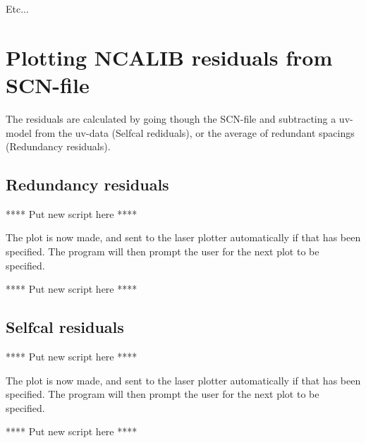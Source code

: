Etc... 


\section{Plotting NCALIB residuals from SCN-file} 
\label{.residuals} 


The residuals are calculated by going though the SCN-file and  subtracting a
uv-model from the uv-data (Selfcal rediduals), or the average of redundant
spacings (Redundancy residuals). 

\subsection{Redundancy residuals} 
\label{.redun.residuals} 

**** Put new script here **** 

The plot is now made, and sent to the laser plotter automatically if that has
been specified. The program will then prompt the user for the next plot  to be
specified. 

**** Put new script here **** 


\subsection{Selfcal residuals} 
\label{.selfcal.residuals} 

**** Put new script here **** 

The plot is now made, and sent to the laser plotter automatically if that has
been specified. The program will then prompt the user for the next plot  to be
specified. 

**** Put new script here **** 




